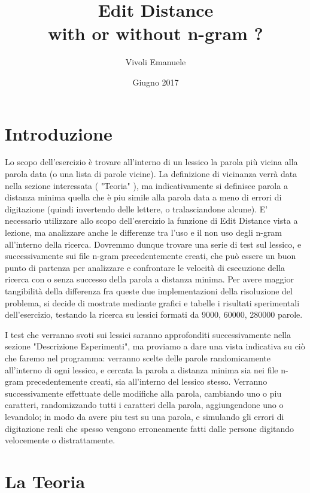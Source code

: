 \documentclass{article}
\title{\huge{Edit Distance}\\{with or without n-gram ?}}
\author{Vivoli Emanuele}
\date{Giugno 2017}
\makeatletter
\renewcommand\tableofcontents{%
    \@starttoc{toc}%
}
\makeatother
\begin{document}
\maketitle
\vspace*{0.30\textheight}
\tableofcontents

\newpage
\section{Introduzione}
Lo scopo dell'esercizio è trovare all'interno di un lessico la parola più vicina alla parola data (o una lista di parole vicine). La definizione di vicinanza verrà data nella sezione interessata ( "Teoria" ), ma indicativamente si definisce parola a distanza minima quella che è piu simile alla parola data a meno di errori di digitazione (quindi invertendo delle lettere, o tralasciandone alcune).   
E' necessario utilizzare allo scopo dell'esercizio la funzione di Edit Distance vista a lezione, ma analizzare anche le differenze tra l'uso e il non uso degli n-gram all'interno della ricerca.
Dovremmo dunque trovare una serie di test sul lessico, e successivamente sui file n-gram precedentemente creati, che può essere un buon punto di partenza per analizzare e confrontare le velocità di esecuzione della ricerca con o senza successo della parola a distanza minima.
Per avere maggior tangibilità della differenza fra queste due implementazioni della risoluzione del problema, si decide di mostrate mediante grafici e tabelle i risultati sperimentali dell'esercizio, testando la ricerca su lessici formati da 9000, 60000, 280000 parole.

I test che verranno svoti sui lessici saranno approfonditi successivamente nella sezione "Descrizione Esperimenti", ma proviamo a dare una vista indicativa su ciò che faremo nel programma:
verranno scelte delle parole randomicamente all'interno di ogni lessico, e cercata la parola a distanza minima sia nei file n-gram precedentemente creati, sia all'interno del lessico stesso. Verranno successivamente effettuate delle modifiche alla parola, cambiando uno o piu caratteri, randomizzando tutti i caratteri della parola, aggiungendone uno o levandolo; in modo da avere piu test su una parola, e simulando gli errori di digitazione reali che spesso vengono erroneamente fatti dalle persone digitando velocemente o distrattamente.

\newpage
\section{La Teoria}
\end{document}
